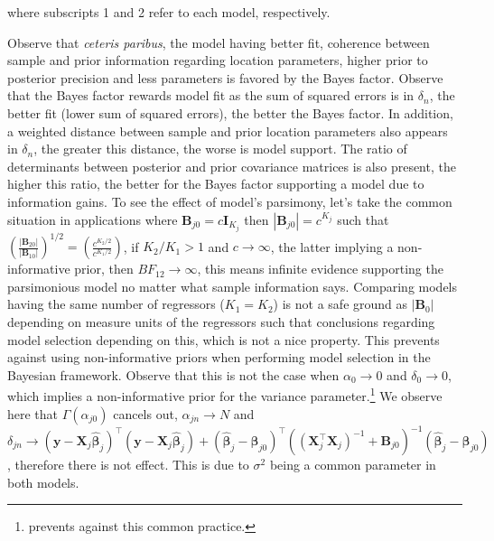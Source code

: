 where subscripts 1 and 2 refer to each model, respectively.

Observe that \textit{ceteris paribus}, the model having better fit, coherence between sample and prior information regarding location parameters, higher prior to posterior precision and less parameters is favored by the Bayes factor. Observe that the Bayes factor rewards model fit as the sum of squared errors is in $\delta_n$, the better fit (lower sum of squared errors), the better the Bayes factor. In addition, a weighted distance between sample and prior location parameters also appears in $\delta_n$, the greater this distance, the worse is model support. The ratio of determinants between posterior and prior covariance matrices is also present, the higher this ratio, the better for the Bayes factor supporting a model due to information gains. To see the effect of model's parsimony, let's take the common situation in applications where ${\bm{B}}_{j0}=c{\bm{I}}_{K_j}$ then $|{\bm{B}}_{j0}|=c^{K_j}$ such that $\left(\frac{|{\bm{B}}_{20}|}{|{\bm{B}}_{10}|}\right)^{1/2}=\left(\frac{c^{K_2/2}}{c^{K_1/2}}\right)$, if $K_2/K_1>1$ and $c\rightarrow\infty$, the latter implying a non-informative prior, then $BF_{12}\rightarrow\infty$, this means infinite evidence supporting the parsimonious model no matter what sample information says. Comparing models having the same number of regressors ($K_1=K_2$) is not a safe ground as $|{\bm{B}}_{0}|$ depending on measure units of the regressors such that conclusions regarding model selection depending on this, which is not a nice property. This prevents against using non-informative priors when performing model selection in the Bayesian framework. Observe that this is not the case when $\alpha_0\rightarrow 0$ and $\delta_0\rightarrow 0$, which implies a non-informative prior for the variance parameter.\footnote{\cite{gelman2006prior} prevents against this common practice.} We observe here that $\Gamma(\alpha_{j0})$ cancels out, $\alpha_{jn} \rightarrow N$ and $\delta_{jn}\rightarrow ({\bm{y}}-{\bm{X}}_j\hat{\bm{\beta}}_j)^{\top}({\bm{y}}-{\bm{X}}_j\hat{\bm{\beta}}_j)+(\hat{\bm{\beta}}_j-\bm{\beta}_{j0})^{\top}(({\bm{X}}_j^{\top}{\bm{X}}_j)^{-1}+{\bm{B}}_{j0})^{-1}(\hat{\bm{\beta}}_j-\bm{\beta}_{j0})$, therefore there is not effect. This is due to $\sigma^2$ being a common parameter in both models.

